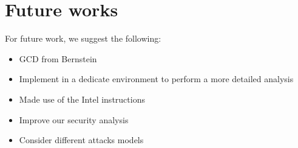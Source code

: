 \section{Future works}
For future work, we suggest the following:

\begin{itemize}
    \item GCD from Bernstein
    \item Implement in a dedicate environment to perform a more detailed analysis
    \item Made use of the Intel instructions
    \item Improve our security analysis
    \item Consider different attacks models
\end{itemize}